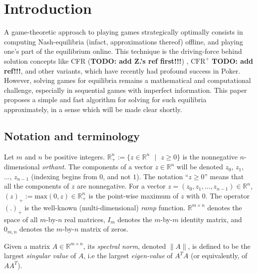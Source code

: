\documentclass{article} %
\begin{document}
\section{Introduction}
\label{sec:intro}
A game-theoretic approach to playing games strategically optimally
consists in computing Nash-equilibria (infact, approximations thereof)
offline, and playing one's part of the equilibrium online. This
technique is the driving-force behind solution concepts like CFR
(\textbf{TODO: add Z.'s ref first!!!}) \cite{lanctot2009monte},
$\text{CFR}^{+}$ \textbf{TODO: add ref!!!}, and other variants, which
have recently had profound success in Poker. However, solving games
for equilibria remains a mathematical and computational challenge,
especially in sequential games with imperfect information. This paper
proposes a simple and fast algorithm for solving for such equilibria
approximately, in a sense which will be made clear shortly.


\subsection{Notation and terminology}
Let $m$ and $n$ be positive integers.
$\mathbb{R}^{n}_+ := \{z \in \mathbb{R}^{n}\text{ }|\text{ } z \geq
0\}$ is the nonnegative $n$-dimensional \textit{orthant}.  The
components of a vector $z \in \mathbb{R}^n$ will be denoted $z_0$,
$z_1$, ..., $z_{n-1}$ (indexing begins from $0$, and not $1$). The
notation ``$z \ge 0$'' means that all the components of $z$ are
nonnegative. For a vector $z = (z_0, z_1, ..., z_{n-1}) \in
\mathbb{R}^n$, %
$(z)_+:=\text{max}(0, z) \in \mathbb{R}^{n}_+$ is the point-wise
maximum of $z$ with $0$.
The operator $(.)_+$ is the well-known
(multi-dimensional) \textit{ramp} function.
$\mathbb{R}^{m \times n}$ denotes the space of all $m$-by-$n$ real
matrices, $I_m$ denotes the $m$-by-$m$ identity matrix, and $0_{m,n}$
denotes the $m$-by-$n$ matrix of zeros.

Given a matrix $A \in \mathbb{R}^{m \times n}$, its \textit{spectral
  norm}, denoted $\|A\|$, is
 defined to be the largest \textit{singular value} of $A$, i.e the
 largest \textit{eigen-value} of $A^TA$ (or equivalently, of $AA^T$).
\end{document}
